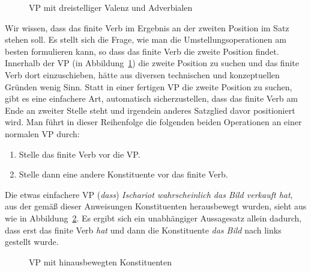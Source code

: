 \begin{figure}
  \caption{VP mit dreistelliger Valenz und Adverbialen}
  \label{fig:vgreinstelligwh}
\end{figure}

Wir wissen, dass das finite Verb im Ergebnis an der zweiten Position im Satz stehen soll.
Es stellt sich die Frage, wie man die Umstellungsoperationen am besten formulieren kann, so dass das finite Verb die zweite Position findet.
Innerhalb der VP (\zB in Abbildung~\ref{fig:vgreinstelligwh}) die zweite Position zu suchen und das finite Verb dort einzuschieben, hätte aus diversen technischen und konzeptuellen Gründen wenig Sinn.
Statt in einer fertigen VP die zweite Position zu suchen, gibt es eine einfachere Art, automatisch sicherzustellen, dass das finite Verb am Ende an zweiter Stelle steht und irgendein anderes Satzglied davor positioniert wird.
Man führt in dieser Reihenfolge die folgenden beiden Operationen an einer normalen VP durch:

\begin{enumerate}\Lf
  \item Stelle das finite Verb vor die VP.
  \item Stelle dann eine andere Konstituente vor das finite Verb.
\end{enumerate}

Die etwas einfachere VP (\textit{dass}) \textit{Ischariot wahrscheinlich das Bild verkauft hat}, aus der gemäß dieser Anweisungen Konstituenten herausbewegt wurden, sieht aus wie in Abbildung~\ref{fig:movev2}.
Es ergibt sich ein unabhängiger Aussagesatz allein dadurch, dass erst das finite Verb \textit{hat} und dann die Konstituente \textit{das Bild} nach links gestellt wurde.

\begin{figure}
  \vspace{0.3cm}
  \caption{VP mit hinausbewegten Konstituenten}
  \label{fig:movev2}
\end{figure}

